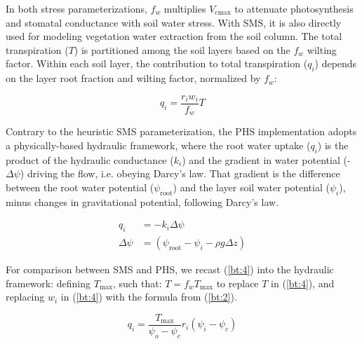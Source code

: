 \documentclass[draft,linenumbers]{agujournal}
\begin{document}
    In both stress parameterizations, $f_w$ multiplies $V_{\text{cmax}}$ to attenuate photosynthesis and stomatal conductance with soil water stress. 
    With SMS, it is also directly used for modeling vegetation water extraction from the soil column. 
    The total transpiration ($T$) is partitioned among the soil layers based on the $f_w$ wilting factor. 
    Within each soil layer, the contribution to total transpiration ($q_i$) depends on the layer root fraction and wilting factor, normalized by $f_w$:

    \begin{linenomath*}
    \begin{equation}
    \label{bt:4}
    q_i = \dfrac{r_i w_i}{f_w}T
    \end{equation}
    \end{linenomath*}
    
    Contrary to the heuristic SMS parameterization, the PHS implementation adopts a physically-based hydraulic framework, where the root water uptake ($q_i$) is 
    the product of the hydraulic conductance ($k_i$) and the gradient in water potential (-$\Delta\psi$) driving the flow, i.e. obeying Darcy's law.
    That gradient is the difference between the root water potential ($\psi_{\text{root}}$) and the layer soil water potential ($\psi_i$), minus changes in gravitational potential, following Darcy's law.
    \begin{linenomath*}
    \begin{equation}
        \begin{aligned}
    q_i &= -k_i \Delta\psi \\
    \Delta\psi &= \left(\psi_{\text{root}}-\psi_{i}-\rho g \Delta z\right)
    \label{phs:sink}
    \end{aligned}
    \end{equation}
    \end{linenomath*}
    
    For comparison between SMS and PHS, we recast (\ref{bt:4}) into the hydraulic framework: defining $T_{\text{max}}$, such that: $T = 
    f_w T_{\text{max}}$ to replace $T$ in (\ref{bt:4}), and replacing $w_i$ in (\ref{bt:4}) with the formula from (\ref{bt:2}).
    
    \begin{linenomath*}
    \begin{equation}
    \label{eq:btrwu}
    q_i = \dfrac{T_{\text{max}}}{\psi_{o}-\psi_{c}} r_i \left(\psi_i-\psi_{c} \right)
    \end{equation}
    \end{linenomath*}
    
\end{document}
